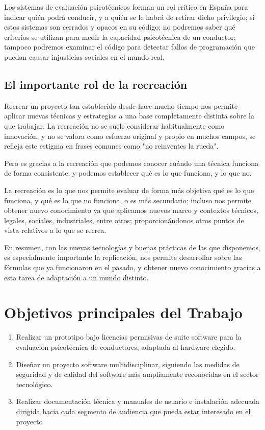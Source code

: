 \documentclass[12pt,a4paper,twoside,openright]{book}
\begin{document}
Los sistemas de evaluación psicotécnicos forman un rol crítico en España para indicar quién podrá conducir, y a quién se le habrá de retirar dicho privilegio; si estos sistemas son cerrados y opacos en su código; no podremos saber qué criterios se utilizan para medir la capacidad psicotécnica de un conductor; tampoco podremos examinar el código para detectar fallos de programación que puedan causar injusticias sociales en el mundo real.

\subsection{El importante rol de la recreación}

Recrear un proyecto tan establecido desde hace mucho tiempo nos permite aplicar nuevas técnicas y estrategias a una base completamente distinta sobre la que trabajar. La recreación no se suele considerar habitualmente como innovación, y no se valora como esfuerzo original y propio en muchos campos, se refleja este estigma en frases comunes como "no reinventes la rueda". 

Pero es gracias a la recreación que podemos conocer cuándo una técnica funciona de forma consistente, y podemos establecer qué es lo que funciona, y lo que no.

La recreación es lo que nos permite evaluar de forma más objetiva qué es lo que funciona, y qué es lo que no funciona, o es más secundario; incluso nos permite obtener nuevo conocimiento ya que aplicamos nuevos marco y contextos técnicos, legales, sociales, industriales, entre otros; proporcionándonos otros puntos de vista relativos a lo que se recrea.

En resumen, con las nuevas tecnologías y buenas prácticas de las que disponemos, es especialmente importante la replicación, nos permite desarrollar sobre las fórmulas que ya funcionaron en el pasado, y obtener nuevo conocimiento gracias a esta tarea de adaptación a un mundo distinto.

\section{Objetivos principales del Trabajo}

\begin{enumerate}
  \item Realizar un prototipo bajo licencias permisivas de suite software para la evaluación psicotécnica de conductores, adaptada al hardware elegido.
  \item Diseñar un proyecto software multidisciplinar, siguiendo las medidas de seguridad y de calidad del software más ampliamente reconocidas en el sector tecnológico.
  \item Realizar documentación técnica y manuales de usuario e instalación adecuada dirigida hacia cada segmento de audiencia que pueda estar interesado en el proyecto
\end{enumerate}
\end{document}

